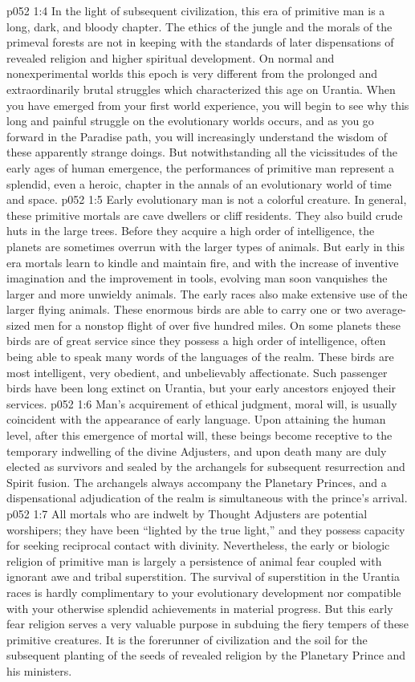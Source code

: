 \vs p052 1:4 In the light of subsequent civilization, this era of primitive man is a long, dark, and bloody chapter. The ethics of the jungle and the morals of the primeval forests are not in keeping with the standards of later dispensations of revealed religion and higher spiritual development. On normal and nonexperimental worlds this epoch is very different from the prolonged and extraordinarily brutal struggles which characterized this age on Urantia. When you have emerged from your first world experience, you will begin to see why this long and painful struggle on the evolutionary worlds occurs, and as you go forward in the Paradise path, you will increasingly understand the wisdom of these apparently strange doings. But notwithstanding all the vicissitudes of the early ages of human emergence, the performances of primitive man represent a splendid, even a heroic, chapter in the annals of an evolutionary world of time and space.
\pc \vs p052 1:5 Early evolutionary man is not a colorful creature. In general, these primitive mortals are cave dwellers or cliff residents. They also build crude huts in the large trees. Before they acquire a high order of intelligence, the planets are sometimes overrun with the larger types of animals. But early in this era mortals learn to kindle and maintain fire, and with the increase of inventive imagination and the improvement in tools, evolving man soon vanquishes the larger and more unwieldy animals. The early races also make extensive use of the larger flying animals. These enormous birds are able to carry one or two average\hyp{}sized men for a nonstop flight of over five hundred miles. On some planets these birds are of great service since they possess a high order of intelligence, often being able to speak many words of the languages of the realm. These birds are most intelligent, very obedient, and unbelievably affectionate. Such passenger birds have been long extinct on Urantia, but your early ancestors enjoyed their services.
\pc \vs p052 1:6 Man’s acquirement of ethical judgment, moral will, is usually coincident with the appearance of early language. Upon attaining the human level, after this emergence of mortal will, these beings become receptive to the temporary indwelling of the divine Adjusters, and upon death many are duly elected as survivors and sealed by the archangels for subsequent resurrection and Spirit fusion. The archangels always accompany the Planetary Princes, and a dispensational adjudication of the realm is simultaneous with the prince’s arrival.
\vs p052 1:7 All mortals who are indwelt by Thought Adjusters are potential worshipers; they have been “lighted by the true light,” and they possess capacity for seeking reciprocal contact with divinity. Nevertheless, the early or biologic religion of primitive man is largely a persistence of animal fear coupled with ignorant awe and tribal superstition. The survival of superstition in the Urantia races is hardly complimentary to your evolutionary development nor compatible with your otherwise splendid achievements in material progress. But this early fear religion serves a very valuable purpose in subduing the fiery tempers of these primitive creatures. It is the forerunner of civilization and the soil for the subsequent planting of the seeds of revealed religion by the Planetary Prince and his ministers.
